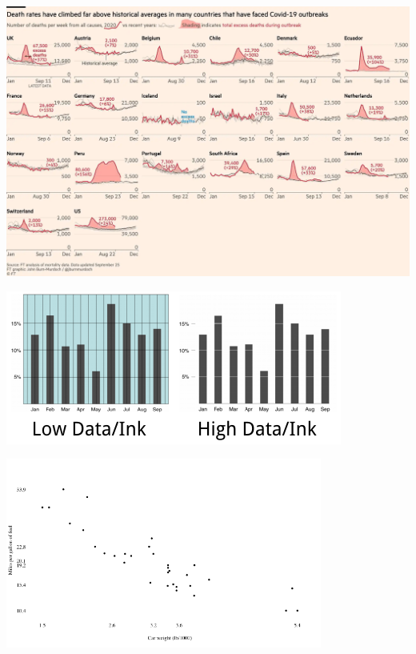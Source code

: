 \documentclass[xcolor=table,aspectratio=169]{beamer}
\begin{document}
\begin{frame}
	\includegraphics[height=\textheight]{pics/coronavirus_ft.png}
\end{frame}

\begin{frame}
  \includegraphics[width=\textwidth]{pics/dataink.png}
\end{frame}

\begin{frame}
  \includegraphics[width=0.78\textwidth]{pics/tufte-scatter.png}
\end{frame}
\end{document}
